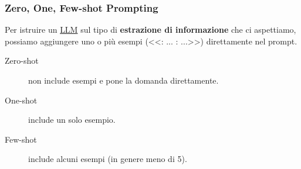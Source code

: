 \subsubsection{Zero, One, Few-shot Prompting}\label{sub:nlp_zero_one_few_shot_prompting} %
Per istruire un \hyperref[sub:large_language_models]{LLM} sul tipo di \textbf{estrazione di informazione} che ci aspettiamo, possiamo aggiungere uno o più esempi (<<: ... : ...>>) direttamente nel prompt.
\begin{description}
    \item[Zero-shot] non include esempi e pone la domanda direttamente.
    \item[One-shot] include un solo esempio.
    \item[Few-shot] include alcuni esempi (in genere meno di 5).
\end{description}
%
